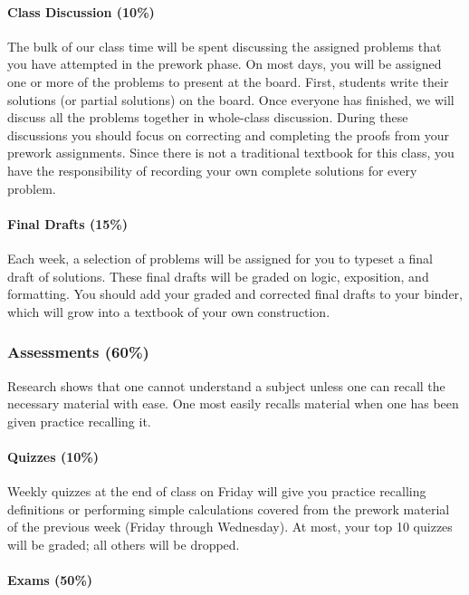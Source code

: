 \documentclass[
  twoside]{article}
\begin{document}
\paragraph{Class Discussion (10\%)}\label{class-discussion-10}

The bulk of our class time will be spent discussing the assigned
problems that you have attempted in the prework phase. On most days, you
will be assigned one or more of the problems to present at the board.
First, students write their solutions (or partial solutions) on the
board. Once everyone has finished, we will discuss all the problems
together in whole-class discussion. During these discussions you should
focus on correcting and completing the proofs from your prework
assignments. Since there is not a traditional textbook for this class,
you have the responsibility of recording your own complete solutions for
every problem.

\paragraph{Final Drafts (15\%)}\label{final-drafts-15}

Each week, a selection of problems will be assigned for you to typeset a
final draft of solutions. These final drafts will be graded on logic,
exposition, and formatting. You should add your graded and corrected
final drafts to your binder, which will grow into a textbook of your own
construction.

\subsubsection{Assessments (60\%)}\label{assessments-60}

Research shows that one cannot understand a subject unless one can
recall the necessary material with ease. One most easily recalls
material when one has been given practice recalling it.

\paragraph{Quizzes (10\%)}\label{quizzes-10}

Weekly quizzes at the end of class on Friday will give you practice
recalling definitions or performing simple calculations covered from the
prework material of the previous week (Friday through Wednesday). At
most, your top 10 quizzes will be graded; all others will be dropped.

\paragraph{Exams (50\%)}\label{exams-50}
\end{document}
